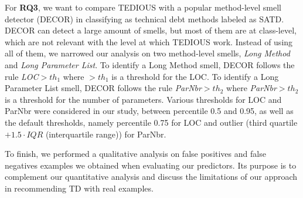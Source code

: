 For \textbf{RQ3}, we want to compare \ac{TEDIOUS} with a popular method-level smell detector (DECOR) \citep{moha2010decor} in classifying as technical debt methods labeled as \ac{SATD}. DECOR can detect a large amount of smells, but most of them are at class-level, which are not relevant with the level at which \ac{TEDIOUS} work. Instead of using all of them, we narrowed our analysis on two method-level smells, \textit{Long Method} and \textit{Long Parameter List}. To identify a Long Method smell, DECOR follows the rule {\em LOC}$>th_1$ where $>th_1$ is a threshold for the LOC. To identify a Long Parameter List smell, DECOR follows the rule {\em ParNbr}$>th_2$ where {\em ParNbr}$>th_2$ is a threshold for the number of parameters. Various thresholds for LOC and ParNbr were considered in our study, between percentile 0.5 and 0.95, as well as the default thresholds, namely percentile 0.75 for LOC and outlier (third quartile $+ 1.5 \cdot IQR$ (interquartile range)) for ParNbr.

To finish, we performed a qualitative analysis on false positives and false negatives examples we obtained when evaluating our predictors. Its purpose is to complement our quantitative analysis and discuss the limitations of our approach in recommending \ac{TD} with real examples.
























